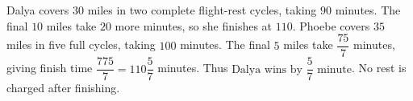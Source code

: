 Dalya covers $30$ miles in two complete flight-rest cycles, taking $90$ minutes. The final $10$ miles take $20$ more minutes, so she finishes at $110$. Phoebe covers $35$ miles in five full cycles, taking $100$ minutes. The final $5$ miles take $\dfrac{75}{7}$ minutes, giving finish time $\dfrac{775}{7}=110\dfrac{5}{7}$ minutes. Thus $\boxed{\text{Dalya wins by }\dfrac{5}{7}\text{ minute}}$. No rest is charged after finishing.
